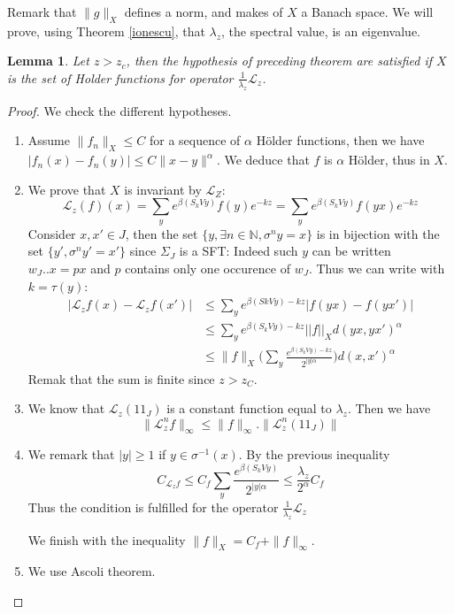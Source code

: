 \documentclass[11 pt]{article}
\newtheorem{lemma}[proposition]{Lemma}
\newcommand {\CL}{{\mathcal L}}
\theoremstyle{definition}
\begin{document}
Remark that $\|g\|_X$ defines a norm, and makes of $X$ a Banach space.
We will prove, using Theorem \ref{ionescu}, that $\lambda_z$, the spectral value, is an eigenvalue.



\begin{lemma}Let $z>z_c$, then the hypothesis of preceding theorem are satisfied if $X$ is the set of Holder functions for operator $\frac{1}{\lambda_z}\mathcal L_z$.
\end{lemma}


\begin{proof}
We check the different hypotheses. 
\begin{enumerate}
\item Assume $\|f_n\|_X\leq C$ for a sequence of $\alpha$ Hölder functions, then we have $|f_n(x)-f_n(y)|\leq C\|x-y\|^\alpha$. We deduce that $f$ is $\alpha$ Hölder, thus in $X$.
\item We prove that $X$ is invariant by $\CL_Z$:
$$\CL_z(f)(x)=\sum_y e^{\beta (S_k Vy)}f(y)e^{-kz}=\sum_y e^{\beta (S_kVy)}f(yx)e^{-kz}$$
Consider $x, x'\in J$, then the set $\{y, \exists n\in\mathbb N, \sigma^ny=x\}$ is in bijection with the set $\{y', \sigma^ny'=x'\}$ since $\Sigma_J$ is a SFT: Indeed such $y$ can be written $w_J..x=px$ and $p$ contains only one occurence of $w_J$. Thus we can write with $k=\tau(y)$:
\begin{align*}
|\CL_zf(x)-\CL_zf(x')|&\leq \sum_y e^{\beta (SkVy)-kz}|f(yx)-f(yx')|\\
 &\leq \sum_y e^{\beta (S_kVy)-kz}||f||_X d(yx,yx')^{\alpha}\\
 &\leq \|f\|_X\big(\sum_y \frac{e^{\beta(S_kVy)-kz}}{2^{|y|\alpha}}\big)d(x,x')^{\alpha}
\end{align*}
Remak that the sum is finite since $z>z_C$.
\item We know that $\CL_z(1\!\!1_J)$ is a constant function equal to $\lambda_z$. Then we have
$$\|\CL_z^nf\|_\infty\leq \|f\|_\infty.\|\CL_z^n(1\!\!1_J)\|$$
\item We remark that $|y|\geq 1$ if $y\in \sigma^{-1}(x)$. 
By the previous inequality
$$C_{\CL_zf}\leq C_f \sum_y \frac{e^{\beta (S_kVy)}}{2^{|y|\alpha}}\leq \frac{\lambda_z}{2^\alpha}C_f$$
Thus the condition is fulfilled for the operator $\frac{1}{\lambda_z}\CL_z$

We finish with the inequality $\|f\|_X=C_f+\|f\|_\infty$. 
\item We use Ascoli theorem.
\end{enumerate}
\end{proof}
\end{document}
